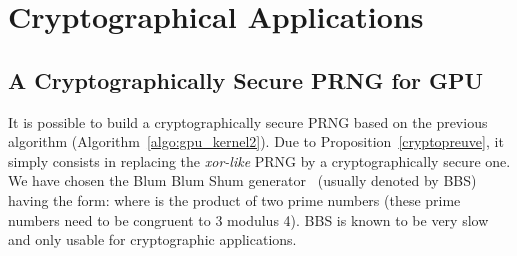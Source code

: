 \documentclass{article}
\begin{document}
\section{Cryptographical Applications}

\subsection{A Cryptographically Secure PRNG for GPU}
\label{sec:CSGPU}

It is  possible to build a  cryptographically secure PRNG based  on the previous
algorithm (Algorithm~\ref{algo:gpu_kernel2}).   Due to Proposition~\ref{cryptopreuve},
it simply consists  in replacing
the  {\it  xor-like} PRNG  by  a  cryptographically  secure one.  
We have chosen the Blum Blum Shum generator~\cite{BBS} (usually denoted by BBS) having the form:
  where  is the product of  two prime numbers (these
prime numbers  need to be congruent  to 3 modulus  4). BBS is known to be
very slow and only usable for cryptographic applications. 
\end{document}

